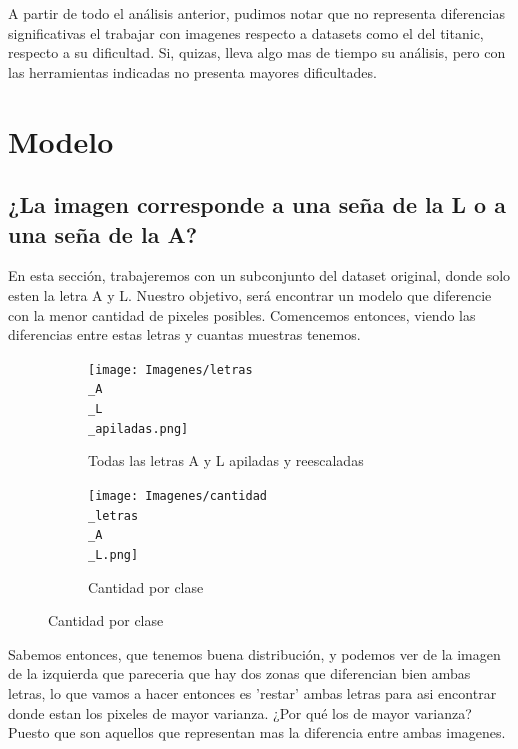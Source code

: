 \documentclass[10pt,a4paper]{article}
\begin{document}
A partir de todo el análisis anterior, pudimos notar que no representa diferencias significativas el trabajar con imagenes respecto a datasets como el del titanic, respecto a su dificultad. Si, quizas, lleva algo mas de tiempo su análisis, pero con las herramientas indicadas no presenta mayores dificultades.

\vspace{0.1cm}


\section{Modelo}

\subsection{¿La imagen corresponde a una seña de la L o a una seña de la A?} \vspace{0.1cm}

En esta sección, trabajeremos con un subconjunto del dataset original, donde solo esten la letra A  y L. Nuestro objetivo, será encontrar un modelo que
diferencie con la menor cantidad de pixeles posibles. Comencemos entonces, viendo las diferencias entre estas letras y cuantas muestras tenemos. 

\begin{figure}[ht!]
	\begin{subfigure}{0.5\textwidth}
		\centering
		\texttt{[image: Imagenes/letras\\\_A\\\_L\\\_apiladas.png]} 
		\caption{Todas las letras A y L apiladas y reescaladas}
		\label{fig:subfig1}
	\end{subfigure}
	\begin{subfigure}{0.55\textwidth}
		\texttt{[image: Imagenes/cantidad\\\_letras\\\_A\\\_L.png]}
		\caption{Cantidad por clase}
		\label{fig:subfig2}
	\end{subfigure}
	\label{fig:subfigs}
\end{figure}

Sabemos entonces, que tenemos buena distribución, y podemos ver de la imagen de la izquierda que pareceria que hay dos zonas que diferencian bien ambas letras, lo que vamos a hacer entonces es 'restar' ambas letras para asi encontrar donde estan los pixeles de mayor varianza. ¿Por qué los de mayor varianza? Puesto que son aquellos que representan mas la diferencia entre ambas imagenes. 
\end{document}
